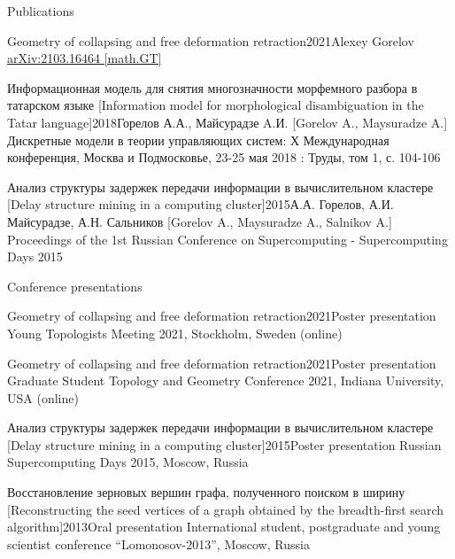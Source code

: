 \documentclass{resume}
\begin{document}
\begin{rSection}{Publications}
  \begin{rSubsection}{Geometry of collapsing and free deformation retraction}{2021}{Alexey Gorelov}{}
    \href{https://arxiv.org/abs/2103.16464}{arXiv:2103.16464 [math.GT]}
  \end{rSubsection}

  \begin{rSubsection}{Информационная модель для снятия многозначности морфемного разбора в татарском
      языке [Information model for morphological disambiguation in the Tatar
      language]}{2018}{Горелов А.А., Майсурадзе A.И. [Gorelov A., Maysuradze A.]}
    Дискретные модели в теории управляющих систем: Х Международная конференция, Москва и Подмосковье,
    23-25 мая 2018 : Труды, том 1, с. 104-106
  \end{rSubsection}

  \begin{rSubsection}{Анализ структуры задержек передачи информации в вычислительном кластере
      [Delay
      structure mining in a computing cluster]}{2015}{А.А. Горелов, А.И. Майсурадзе, А.Н. Сальников [Gorelov A., Maysuradze A., Salnikov A.]}{}
    Proceedings of the 1st Russian Conference on Supercomputing - Supercomputing Days 2015
  \end{rSubsection}
\end{rSection}

\begin{rSection}{Conference presentations}
  \begin{rSubsection}{Geometry of collapsing and free deformation retraction}{2021}{Poster presentation}
    Young Topologists Meeting 2021, Stockholm, Sweden (online)
  \end{rSubsection}

  \begin{rSubsection}{Geometry of collapsing and free deformation retraction}{2021}{Poster presentation}
    Graduate Student Topology and Geometry Conference 2021, Indiana University, USA (online)
  \end{rSubsection}

  \begin{rSubsection}{Анализ структуры задержек передачи информации в вычислительном кластере [Delay
      structure mining in a computing cluster]}{2015}{Poster presentation}
    Russian Supercomputing Days 2015, Moscow, Russia
  \end{rSubsection}
  
  \begin{rSubsection}{Восстановление зерновых вершин графа, полученного поиском в
      ширину [Reconstructing the seed vertices of a graph obtained by the breadth-first search
      algorithm]}{2013}{Oral presentation}
    International student, postgraduate and young scientist conference ``Lomonosov-2013'', Moscow, Russia
  \end{rSubsection}
\end{rSection}
\end{document}
